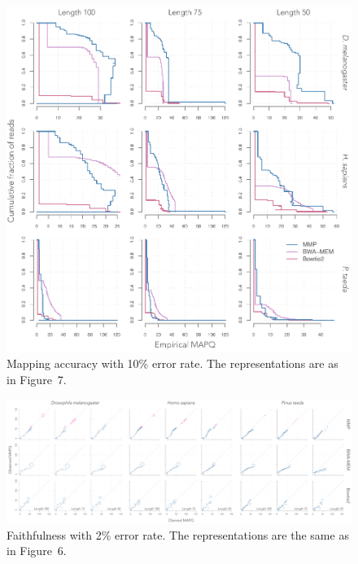 \documentclass{article}
\begin{document}
\begin{figure}
\begin{center}
\includegraphics[scale=.54]{accQ10_fig.pdf}
\end{center}
\caption{Mapping accuracy with 10\% error rate. The representations are
as in Figure~7.}
\end{figure}

\clearpage

\begin{figure}
\begin{center}
\includegraphics[scale=.24]{faith_Q2.pdf}
\end{center}
\caption{Faithfulness with 2\% error rate. The representations are
the same as in Figure~6.}
\end{figure}
\end{document}
